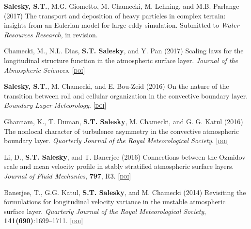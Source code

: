 \documentclass[11pt,letterpaper]{article}
\begin{document}
\textbf{Salesky, S.T.}, M.G. Giometto, M. Chamecki, M. Lehning, and M.B.
Parlange (2017) The transport and deposition of heavy particles in complex
terrain: insights from an Eulerian model for large eddy simulation. Submitted
to \textit{Water Resources Research}, in revision.

Chamecki, M., N.L. Dias, \textbf{S.T. Salesky}, and Y. Pan (2017) Scaling laws
for the longitudinal structure function in the atmospheric surface layer.
\textit{Journal of the Atmospheric Sciences}.
[\href{http://doi.org/10.1175/JAS-D-16-0228.1}{\textsc{doi}}]


\textbf{Salesky, S.T.}, M. Chamecki, and E. Bou-Zeid (2016) On the nature of
the transition between roll and cellular organization in the convective
boundary layer. \textit{Boundary-Layer Meteorology}. 
[\href{http://doi.org/10.1007/s10546-016-0220-3}{\textsc{doi}}]



Ghannam, K., T. Duman, \textbf{S.T. Salesky}, M. Chamecki, and G. G. Katul
(2016) The nonlocal character of turbulence asymmetry in the convective
atmospheric boundary layer. \textit{Quarterly Journal of the 
  Royal Meteorological Society}. 
[\href{http://doi.org/10.1002/qj.2937}{\textsc{doi}}]

Li, D., \textbf{S.T. Salesky}, and T. Banerjee (2016) Connections between
the Ozmidov scale and mean velocity profile in stably stratified atmospheric
surface layers. \textit{Journal of Fluid Mechanics}, \textbf{797}, R3. [\href{http://doi.org/10.1017/jfm.2016.311}{\textsc{doi}}]

Banerjee, T., G.G. Katul, \textbf{S.T. Salesky}, and M. Chamecki (2014)
Revisiting the formulations for longitudinal velocity variance in the unstable
atmospheric surface layer. \textit{Quarterly Journal of the Royal
  Meteorological Society}, \textbf{141(690)}:1699--1711.
[\href{http://doi.org/10.1002/qj.2472}{\textsc{doi}}] 
\end{document}
